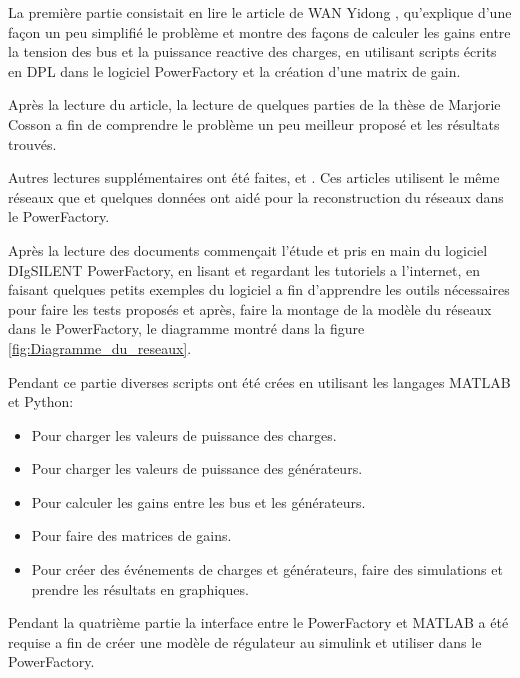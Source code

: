
La première partie consistait en lire le article de WAN Yidong \cite{yidong}, qu'explique d'une façon un peu simplifié le problème et montre des façons de calculer les gains entre la tension des bus et la puissance reactive des charges, en utilisant scripts écrits en \gls{DPL} dans le logiciel PowerFactory et la création d'une matrix de gain.

Après la lecture du article, la lecture de quelques parties de la thèse de Marjorie Cosson \cite{cosson:tel-01374469} a fin de comprendre le problème un peu meilleur   proposé et les résultats trouvés. 

Autres lectures supplémentaires ont été faites, \cite{farina2015model} et \cite{mariani2013controllo}. Ces articles utilisent le même réseaux que \cite{cosson:tel-01374469} et quelques données ont aidé pour la reconstruction du réseaux dans le PowerFactory.


Après la lecture des documents commençait l'étude et pris en main du logiciel DIgSILENT PowerFactory, en lisant et regardant les tutoriels a l'internet, en faisant quelques petits exemples du logiciel a fin d'apprendre les outils nécessaires pour faire les tests proposés et après, faire la montage de la modèle du réseaux dans le PowerFactory, le diagramme montré dans la figure \ref{fig:Diagramme_du_reseaux}. 

Pendant ce partie diverses scripts ont été crées en utilisant les langages MATLAB et Python:
\begin{itemize}
	\item Pour charger les valeurs de puissance des charges.
	\item Pour charger les valeurs de puissance des générateurs.
	\item Pour calculer les gains entre les bus et les générateurs.
	\item Pour faire des matrices de gains.
	\item Pour créer des événements de charges et générateurs, faire des simulations et prendre les résultats en graphiques.
\end{itemize}

	Pendant la quatrième partie la interface entre le PowerFactory et MATLAB a été requise a fin de créer une modèle de régulateur au simulink et utiliser dans le PowerFactory. 
\pagebreak

